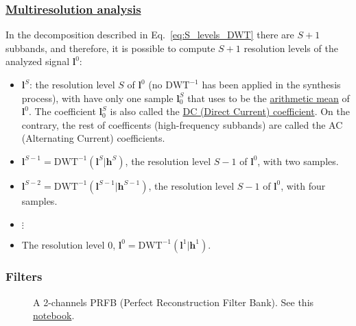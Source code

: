 \subsubsection{\href{https://en.wikipedia.org/wiki/Multiresolution_analysis}{Multiresolution analysis}}
In the decomposition described in Eq.~\ref{eq:S_levels_DWT} there are
$S+1$ subbands, and therefore, it is possible to compute $S+1$
resolution levels of the analyzed signal ${\mathbf l}^0$:
\begin{itemize}
\item  ${\mathbf l}^S$: the resolution level $S$ of ${\mathbf l}^0$ (no $\text{DWT}^{-1}$ has been
  applied in the synthesis process), with have only one sample ${\mathbf l}^S_0$ that uses to be the
  \href{https://en.wikipedia.org/wiki/Arithmetic_mean}{arithmetic
    mean} of ${\mathbf l}^0$. The coefficient ${\mathbf l}^S_0$
  is also called the \href{https://en.wikipedia.org/wiki/DC_bias}{DC
    (Direct Current) coefficient}. On the contrary, the rest of
  coefficents (high-frequency subbands) are called the AC (Alternating
  Current) coefficients.
\item ${\mathbf l}^{S-1}=\text{DWT}^{-1}({\mathbf l}^S | {\mathbf
  h}^S)$, the resolution level $S-1$ of ${\mathbf l}^0$, with two
  samples.
\item ${\mathbf l}^{S-2}=\text{DWT}^{-1}({\mathbf l}^{S-1} | {\mathbf
  h}^{S-1})$, the resolution level $S-1$ of ${\mathbf l}^0$, with
  four samples.
\item $\vdots$
\item The resolution level $0$, ${\mathbf
  l}^0=\text{DWT}^{-1}({\mathbf l}^1 | {\mathbf h}^1)$.
\end{itemize}  

\subsubsection{Filters}

\begin{figure}
  \centering
  \caption{A 2-channels PRFB (Perfect Reconstruction Filter Bank). See
    this
    \href{https://github.com/Sistemas-Multimedia/Sistemas-Multimedia.github.io/blob/master/milestones/08-DWT/PRFB.ipynb}{notebook}.}
  \label{fig:PRFB}
\end{figure}

